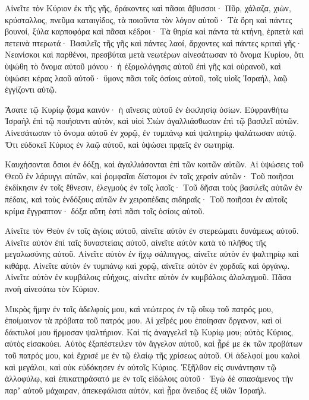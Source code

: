 \begin{spacing}{1.1}
\begin{multicols}{2}
Αἰνεῖτε τὸν Κύριον ἐκ τῆς γῆς, δράκοντες καὶ πᾶσαι ἄβυσσοι·
Πῦρ, χάλαζα, χιὼν, κρύσταλλος, πνεῦμα καταιγίδος, τὰ ποιοῦντα τὸν λόγον αὐτοῦ·
Τὰ ὄρη καὶ πάντες βουνοί, ξύλα καρποφόρα καὶ πᾶσαι κέδροι·
Τὰ θηρία καὶ πάντα τὰ κτήνη, ἑρπετὰ καὶ πετεινὰ πτερωτά·
Βασιλεῖς τῆς γῆς καὶ πάντες λαοί, ἄρχοντες καὶ πάντες κριταὶ γῆς·
Νεανίσκοι καὶ παρθένοι, πρεσβύται μετὰ νεωτέρων
αἰνεσάτωσαν τὸ ὄνομα Κυρίου, ὅτι ὑψώθη τὸ ὄνομα αὐτοῦ μόνου· ἡ ἐξομολόγησις αὐτοῦ ἐπὶ γῆς καὶ οὐρανοῦ,
καὶ ὑψώσει κέρας λαοῦ αὐτοῦ· ὕμονς πᾶσι τοῖς ὁσίοις αὐτοῦ, τοῖς υἱοῖς Ἰσραήλ, λαῷ ἐγγίζοντι αὐτῷ.

Ἄσατε τῷ Κυρίῳ ᾆσμα καινόν· ἡ αἴνεσις αὐτοῦ ἐν ἐκκλησίᾳ ὁσίων.
Εὐφρανθήτω Ἰσραὴλ ἐπὶ τῷ ποιήσαντι αὐτὸν, καὶ υἱοὶ Σιὼν ἀγαλλιάσθωσαν ἐπὶ τῷ βασιλεῖ αὐτῶν.
Αἰνεσάτωσαν τὸ ὄνομα αὐτοῦ ἐν χορῷ, ἐν τυμπάνῳ καὶ ψαλτηρίῳ ψαλάτωσαν αὐτῷ.
Ὅτι εὐδοκεῖ Κύριος ἐν λαῷ αὐτοῦ, καὶ ὑψώσει πρᾳεῖς ἐν σωτηρίᾳ.

Καυχήσονται ὅσιοι ἐν δόξῃ, καὶ ἀγαλλιάσονται ἐπὶ τῶν κοιτῶν αὐτῶν.
Αἱ ὑψώσεις τοῦ Θεοῦ ἐν λάρυγγι αὐτῶν, καὶ ῥομφαῖαι δίστομοι ἐν ταῖς χερσὶν αὐτῶν·
Τοῦ ποιῆσαι ἐκδίκησιν ἐν τοῖς ἔθνεσιν, ἐλεγμοὺς ἐν τοῖς λαοῖς·
Τοῦ δῆσαι τοὺς βασιλεῖς αὐτῶν ἐν πέδαις, καὶ τοὺς ἐνδόξους αὐτῶν ἐν χειροπέδαις σιδηραῖς·
Τοῦ ποιῆσαι ἐν αὐτοῖς κρίμα ἔγγραπτον· δόξα αὕτη ἐστὶ πᾶσι τοῖς ὁσίοις αὐτοῦ.

Αἰνεῖτε τὸν Θεὸν ἐν τοῖς ἁγίοις αὐτοῦ, αἰνεῖτε αὐτὸν ἐν στερεώματι δυνάμεως αὐτοῦ.
Αἰνεῖτε αὐτὸν ἐπὶ ταῖς δυναστείαις αὐτοῦ, αἰνεῖτε αὐτὸν κατὰ τὸ πλῆθος τῆς μεγαλωσύνης αὐτοῦ.
Αἰνεῖτε αὐτὸν ἐν ἤχῳ σάλπιγγος, αἰνεῖτε αὐτὸν ἐν ψαλτηρίῳ καὶ κιθάρᾳ.
Αἰνεῖτε αὐτὸν ἐν τυμπάνῳ καὶ χορῷ, αἰνεῖτε αὐτὸν ἐν χορδαῖς καὶ ὀργάνῳ.
Αἰνεῖτε αὐτὸν ἐν κυμβάλοις εὐήχοις, αἰνεῖτε αὐτὸν ἐν κυμβάλοις ἀλαλαγμοῦ.
Πᾶσα πνοὴ αἰνεσάτω τὸν Κύριον.

Μικρὸς ἤμην ἐν τοῖς ἀδελφοίς μου, καὶ νεώτερος ἐν τῷ οἴκῳ τοῦ πατρός μου, ἐποίμαινον τὰ πρόβατα τοῦ πατρός μου.
Αἱ χεῖρές μου ἐποίησαν ὄργανον, καὶ οἱ δάκτυλοί μου ἥρμοσαν ψαλτήριον.
Καὶ τίς ἀναγγελεῖ τῷ Κυρίῳ μου; αὐτὸς Κύριος, αὐτὸς εἰσακούει.
Αὐτὸς ἐξαπέστειλεν τὸν ἄγγελον αὐτοῦ, καὶ ᾖρέ με ἐκ τῶν προβάτων τοῦ πατρός μου, καὶ ἔχρισέ με ἐν τῷ ἐλαίῳ τῆς χρίσεως αὐτοῦ.
Οἱ ἀδελφοί μου καλοὶ καὶ μεγάλοι, καὶ οὐκ εὐδόκησεν ἐν αὐτοῖς Κύριος.
Ἐξῆλθον εἰς συνάντησιν τῷ ἀλλοφύλῳ, καὶ ἐπικατηράσατό με ἐν τοῖς εἰδώλοις αὐτοῦ·
Ἐγὼ δὲ σπασάμενος τὴν παρʼ αὐτοῦ μάχαιραν, ἀπεκεφάλισα αὐτόν, καὶ ᾖρα ὄνειδος ἐξ υἱῶν Ἰσραήλ.\end{multicols} %
\vfill
\setlength{\parindent}{0cm}
\fontsize{8}{10}

\end{spacing}
